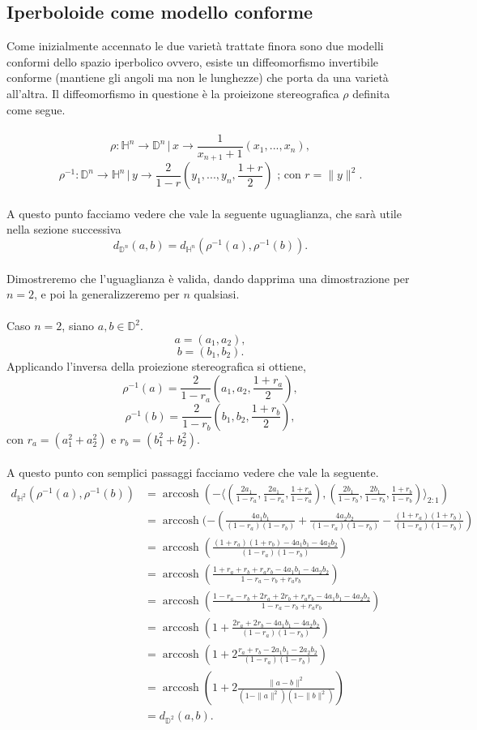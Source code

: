 \documentclass[a4paper, 12pt]{article}
\DeclareMathOperator\arccosh{arccosh}
\begin{document}
\subsection{Iperboloide come modello conforme} \label{centroide}
Come inizialmente accennato le due varietà trattate finora sono due modelli conformi dello spazio iperbolico ovvero, esiste un diffeomorfismo invertibile conforme (mantiene gli angoli ma non le lunghezze) che porta da una varietà all'altra. Il diffeomorfismo in questione è la proieizone stereografica $\rho$ definita come segue.\\\\
\[\rho : \mathbb{H}^n \to \mathbb{D}^n \, | \, x \to \frac{1}{x_{n+1} + 1}(x_1, ..., x_n),\]
\[\rho^{-1} : \mathbb{D}^n \to \mathbb{H}^n \, | \, y \to \frac{2}{1 - r}(y_1, ..., y_n, \frac{1+r}{2}) \mbox{ ; con } r = \| y \|^2.\]\\
A questo punto facciamo vedere che vale la seguente uguaglianza, che sarà utile nella sezione successiva\\
\[d_{\mathbb{D}^n}(a, b) = d_{\mathbb{H}^n}(\rho^{-1}(a), \rho^{-1}(b)).\]\\
Dimostreremo che l'uguaglianza è valida, dando dapprima una dimostrazione per $n = 2$, e poi la generalizzeremo per $n$ qualsiasi.\\\\
Caso $n=2$, siano $a, b \in \mathbb{D}^2$.\\
\[a = (a_1, a_2),\]
\[b = (b_1, b_2).\]
Applicando l'inversa della proiezione stereografica si ottiene,
\[\rho^{-1}(a) = \frac{2}{1-r_a}(a_1, a_2, \frac{1 + r_a}{2}),\]
\[\rho^{-1}(b) = \frac{2}{1-r_b}(b_1, b_2, \frac{1 + r_b}{2}),\]
con $r_a = (a_1^2 + a_2^2)$ e $r_b = (b_1^2 + b_2^2)$.\\\\
A questo punto con semplici passaggi facciamo vedere che vale la seguente.
\begin{equation*}\begin{split}
d_{\mathbb{H}^2}(\rho^{-1}(a), \rho^{-1}(b)) &= \arccosh(-\langle (\frac{2a_1}{1-r_a}, \frac{2a_1}{1-r_a}, \frac{1+r_a}{1-r_a}), (\frac{2b_1}{1-r_b}, \frac{2b_1}{1-r_b}, \frac{1+r_b}{1-r_b}) \rangle_{2:1})\\
&=\arccosh(- (\frac{4a_1b_1}{(1-r_a)(1-r_b)} + \frac{4a_2b_2}{(1-r_a)(1-r_b)} - \frac{(1+r_a)(1+r_b)}{(1-r_a)(1-r_b)})\\
&=\arccosh(\frac{(1+r_a)(1+r_b) - 4a_1b_1 - 4a_2b_2}{(1-r_a)(1-r_b)})\\
&=\arccosh(\frac{1 + r_a +r_b + r_ar_b - 4a_1b_1 - 4a_2b_2}{1 - r_a - r_b + r_ar_b})\\
&=\arccosh(\frac{1 -r_a -r_b + 2r_a + 2r_b + r_ar_b - 4a_1b_1 - 4a_2b_2}{1 - r_a - r_b + r_ar_b})\\
&=\arccosh(1 + \frac{2r_a + 2r_b - 4a_1b_1 - 4a_2b_2}{(1-r_a)(1-r_b)})\\
&=\arccosh(1 + 2 \frac{r_a + r_b - 2a_1b_1 - 2a_2b_2}{(1-r_a)(1-r_b)})\\
&=\arccosh(1 + 2\frac{\| a - b \|^2}{(1 - \| a \|^2)(1 - \| b \|^2)})\\
&=d_{\mathbb{D}^2}(a, b).
\end{split}\end{equation*}
\end{document}

